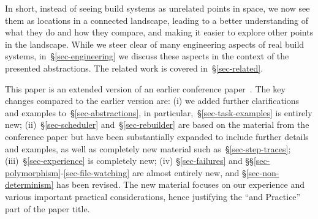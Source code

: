 In short, instead of seeing build systems as unrelated points in space, we now
see them as locations in a connected landscape, leading to a better
understanding of what they do and how they compare, and making it easier to
explore other points in the landscape. While we steer clear of many engineering
aspects of real build systems, in~\S\ref{sec-engineering} we discuss these
aspects in the context of the presented abstractions. The related work is covered
in~\S\ref{sec-related}.

This paper is an extended version of an earlier conference
paper~\cite{mokhov2018buildsystems}. The key changes compared to the earlier
version are: (i) we added further clarifications and examples
to~\S\ref{sec-abstractions}, in particular,~\S\ref{sec-task-examples} is
entirely new; (ii)~\S\ref{sec-scheduler} and~\S\ref{sec-rebuilder} are based on
the material from the conference paper but have been substantially expanded to
include further details and examples, as well as completely new material such
as~\S\ref{sec-step-traces}; (iii)~\S\ref{sec-experience} is completely new; (iv)
\S\ref{sec-failures} and \S\S\ref{sec-polymorphism}-\ref{sec-file-watching}
are almost entirely new, and \S\ref{sec-non-determinism} has been revised.
The new material focuses on our experience and various important practical
considerations, hence justifying the ``and Practice'' part of the paper title.
